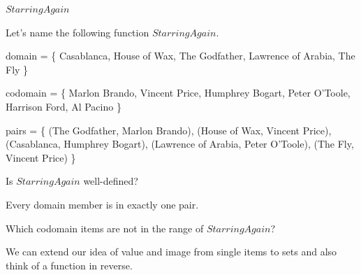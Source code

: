 \documentclass{ximera}
\begin{document}
\begin{example} $StarringAgain$

Let's name the following function $StarringAgain$.

domain = \{ Casablanca, House of Wax,  The Godfather, Lawrence of Arabia, The Fly \}

codomain = \{ Marlon Brando, Vincent Price, Humphrey Bogart, Peter O'Toole, Harrison Ford, Al Pacino \}

pairs = \{ (The Godfather, Marlon Brando), (House of Wax, Vincent Price), (Casablanca, Humphrey Bogart), (Lawrence of Arabia, Peter O'Toole), (The Fly, Vincent Price) \} 





\begin{question}

Is $StarringAgain$ well-defined?

\begin{multipleChoice}
\end{multipleChoice}
\begin{feedback}
Every domain member is in exactly one pair.
\end{feedback}

\end{question}







\begin{question}

Which codomain items are not in the range of $StarringAgain$?

\begin{selectAll}
\end{selectAll}

\end{question}





\end{example}







We can extend our idea of value and image from single items to sets and also think of a function in reverse. 
\end{document}
